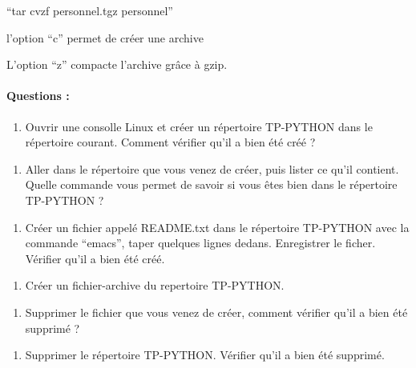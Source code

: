 \documentclass{article}
\begin{document}
``tar cvzf personnel.tgz personnel''

l'option ``c'' permet de créer une archive

L'option ``z'' compacte l'archive grâce à gzip.

    \paragraph{Questions :}\label{questions}

    \begin{enumerate}
\def\labelenumi{\arabic{enumi})}
\itemsep1pt\parskip0pt
\item
  Ouvrir une consolle Linux et créer un répertoire TP-PYTHON dans le
  répertoire courant. Comment vérifier qu'il a bien été créé ?
\end{enumerate}

    \begin{enumerate}
\def\labelenumi{\arabic{enumi})}
\setcounter{enumi}{1}
\itemsep1pt\parskip0pt
\item
  Aller dans le répertoire que vous venez de créer, puis lister ce qu'il
  contient. Quelle commande vous permet de savoir si vous êtes bien dans
  le répertoire TP-PYTHON ?
\end{enumerate}

    \begin{enumerate}
\def\labelenumi{\arabic{enumi})}
\setcounter{enumi}{2}
\itemsep1pt\parskip0pt
\item
  Créer un fichier appelé README.txt dans le répertoire TP-PYTHON avec
  la commande ``emacs'', taper quelques lignes dedans. Enregistrer le
  ficher. Vérifier qu'il a bien été créé.
\end{enumerate}

    \begin{enumerate}
\def\labelenumi{\arabic{enumi})}
\setcounter{enumi}{3}
\itemsep1pt\parskip0pt
\item
  Créer un fichier-archive du repertoire TP-PYTHON.
\end{enumerate}

    \begin{enumerate}
\def\labelenumi{\arabic{enumi})}
\setcounter{enumi}{4}
\itemsep1pt\parskip0pt
\item
  Supprimer le fichier que vous venez de créer, comment vérifier qu'il a
  bien été supprimé ?
\end{enumerate}

    \begin{enumerate}
\def\labelenumi{\arabic{enumi})}
\setcounter{enumi}{5}
\itemsep1pt\parskip0pt
\item
  Supprimer le répertoire TP-PYTHON. Vérifier qu'il a bien été supprimé.
\end{enumerate}
\end{document}

